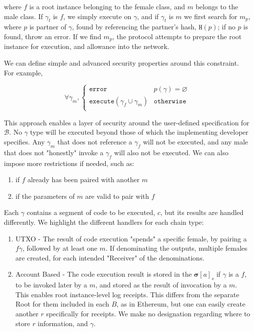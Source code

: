 \documentclass[12pt, titlepage, twocolumn]{report}
\begin{document}
where \(f\) is a root instance belonging to the female class, and \(m\) belongs to the male class. If \(\gamma_{t}\) is \(f\), we simply execute on \(\gamma\), and if \(\gamma_{t}\) is \(m\) we first search for \(m_{p}\), where \(p\) is partner of \(\gamma\), found by referencing the partner's hash, \(\texttt{H}(p)\); if no \(p\) is found, throw an error. If we find \(m_{p}\), the protocol attempts to prepare the root instance for execution, and allowance into the network.

We can define simple and advanced security properties around this constraint. For example,

\begin{equation}
\forall \gamma_m, \begin{cases} 
      \texttt{error} & p(\gamma) = \varnothing \\
      \texttt{execute}(\gamma_f \cup \gamma_m)   & \texttt{otherwise}  \\
   \end{cases}
\end{equation}

This approach enables a layer of security around the user-defined specification for \( \boldsymbol{\mathcal{B}} \). No \(\gamma\) type will be executed beyond those of which the implementing developer specifies. Any \(\gamma_m\) that does not reference a \(\gamma_f\) will not be executed, and any male that does not "honestly" invoke a \(\gamma_f\) will also not be executed. We can also impose more restrictions if needed, such as:

\begin{enumerate}
	\item if \(f\) already has been paired with another \(m\)
	\item if the parameters of \(m\) are valid to pair with \(f\)
\end{enumerate}

Each \(\gamma\) contains a segment of code to be executed, \(c\), but its results are handled differently. We highlight the different handlers for each chain type:

\begin{enumerate}
	\item UTXO - The result of code execution "spends" a specific female, by pairing a \(f \gamma\), followed by at least one \(m\). If denominating the outputs, multiple females are created, for each intended "Receiver" of the denominations.
	\item Account Based - The code execution result is stored in the \( \boldsymbol{ \sigma } [a]_{s} \) if \(\gamma\) is a \(f\), to be invoked later by a \(m\), and stored as the result of invocation by a \(m\). This enables root instance-level log receipts. This differs from the separate Root for them included in each \(B\), as in Ethereum, but one can easily create another \(r\) specifically for receipts. We make no designation regarding where to store \(r\) information, and \(\gamma\).
\end{enumerate}
\end{document}
